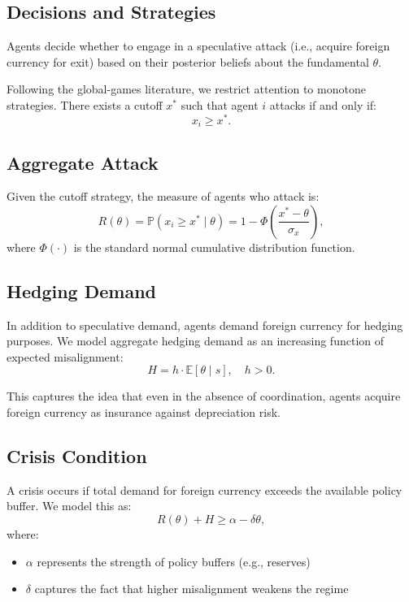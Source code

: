 \subsection{Decisions and Strategies}

Agents decide whether to engage in a speculative attack (i.e., acquire foreign currency for exit) based on their posterior beliefs about the fundamental $\theta$.

Following the global-games literature, we restrict attention to monotone strategies. There exists a cutoff $x^*$ such that agent $i$ attacks if and only if:
\begin{equation}
x_i \geq x^*.
\end{equation}

\subsection{Aggregate Attack}

Given the cutoff strategy, the measure of agents who attack is:
\begin{equation}
R(\theta) = \mathbb{P}(x_i \geq x^* \mid \theta) = 1 - \Phi\left(\frac{x^* - \theta}{\sigma_x}\right),
\end{equation}
where $\Phi(\cdot)$ is the standard normal cumulative distribution function.

\subsection{Hedging Demand}

In addition to speculative demand, agents demand foreign currency for hedging purposes. We model aggregate hedging demand as an increasing function of expected misalignment:
\begin{equation}
H = h \cdot \mathbb{E}[\theta \mid s], \quad h > 0.
\end{equation}

This captures the idea that even in the absence of coordination, agents acquire foreign currency as insurance against depreciation risk.

\subsection{Crisis Condition}

A crisis occurs if total demand for foreign currency exceeds the available policy buffer. We model this as:
\begin{equation}
R(\theta) + H \geq \alpha - \delta \theta,
\end{equation}
where:
\begin{itemize}
\item $\alpha$ represents the strength of policy buffers (e.g., reserves)
\item $\delta$ captures the fact that higher misalignment weakens the regime
\end{itemize}

